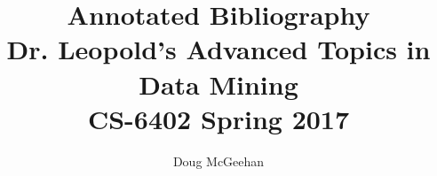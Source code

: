 \documentclass[11pt]{article}
\title{
	Annotated Bibliography \\
	\large Dr. Leopold's Advanced Topics in Data Mining \\
	CS-6402 Spring 2017
}
\author{Doug McGeehan}
\begin{document}
\maketitle
\nocite{*}

{}
\end{document}
